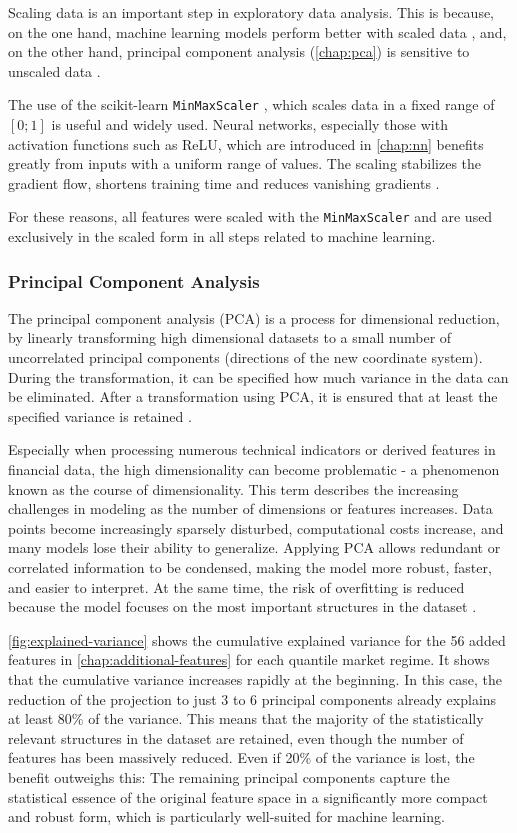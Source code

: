 Scaling data is an important step in exploratory data analysis.
This is because, on the one hand, machine learning models perform better with scaled data \cite{data-scaling}, and, on the other hand, principal component analysis (\autoref{chap:pca}) is sensitive to unscaled data \cite{pca-scaling}.

The use of the scikit-learn \texttt{MinMaxScaler} \cite{min-max}, which scales data in a fixed range of $[0; 1]$ is useful and widely used.
Neural networks, especially those with activation functions such as ReLU, which are introduced in \autoref{chap:nn} benefits greatly from inputs with a uniform range of values.
The scaling stabilizes the gradient flow, shortens training time and reduces vanishing gradients \cite{min-max-benefits}.

For these reasons, all features were scaled with the \texttt{MinMaxScaler} and are used exclusively in the scaled form in all steps related to machine learning.

\subsubsection{Principal Component Analysis}
\label{chap:pca}

The principal component analysis (PCA) is a process for dimensional reduction, by linearly transforming high dimensional datasets to a small number of uncorrelated principal components  (directions of the new coordinate system).
During the transformation, it can be specified how much variance in the data can be eliminated.
After a transformation using PCA, it is ensured that at least the specified variance is retained \cite{wikipedia-pca}.

Especially when processing numerous technical indicators or derived features in financial data, the high dimensionality can become problematic - a phenomenon known as the course of dimensionality.
This term describes the increasing challenges in modeling as the number of dimensions or features increases.
Data points become increasingly sparsely disturbed, computational costs increase, and many models lose their ability to generalize.
Applying PCA allows redundant or correlated information to be condensed, making the model more robust, faster, and easier to interpret.
At the same time, the risk of overfitting is reduced because the model focuses on the most important structures in the dataset \cite{wikipedia-curse-od-dimensionality}.

\autoref{fig:explained-variance} shows the cumulative explained variance for the 56 added features in \autoref{chap:additional-features} for each quantile market regime.
It shows that the cumulative variance increases rapidly at the beginning.
In this case, the reduction of the projection to just 3 to 6 principal components already explains at least 80\% of the variance.
This means that the majority of the statistically relevant structures in the dataset are retained, even though the number of features has been massively reduced.
Even if 20\% of the variance is lost, the benefit outweighs this: The remaining principal components capture the statistical essence of the original feature space in a significantly more compact and robust form, which is particularly well-suited for machine learning.


